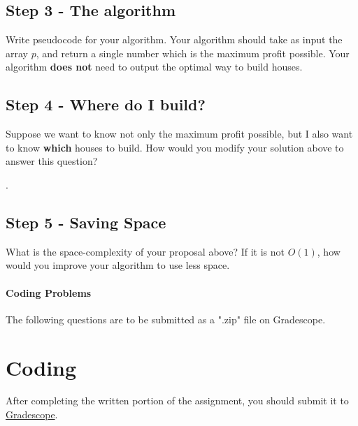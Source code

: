 \documentclass [12pt]{article}
\begin{document}

 
\subsection{Step 3 - The algorithm } 
Write pseudocode for your algorithm. Your algorithm should take as input the array $p$, and return a single number which is the maximum profit possible. Your algorithm \textbf{does not} need to output the optimal way to build houses.


\subsection{Step 4 - Where do I build? } 
Suppose we want to know not only the maximum profit possible, but I also want to know \textbf{which} houses to build. How would you modify your solution above to answer this question?

.

\subsection{Step 5 - Saving Space }
What is the space-complexity of your proposal above? If it is not $O(1)$, how would you improve your algorithm to use less space.






\pagebreak
\begin{Instruction}

\paragraph{Coding Problems} The following questions are to be submitted as a ".zip" file on Gradescope. 

\end{Instruction}

\section{Coding }
After completing the written portion of the assignment, you should submit it to \href{https://www.gradescope.com/courses/350304}{Gradescope}.
\end{document}

